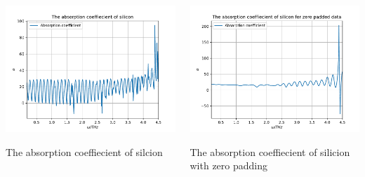 \documentclass[aspectratio=1610, 9pt]{beamer}
\begin{document}
\begin{frame}
  \begin{center}
    \begin{columns}
      \begin{column}
        \includegraphics[width=\textwidth]{silicon/THz_absorption.pdf}
        \caption{The absorption coeffiecient of silcion}
      \end{column}
      \begin{column}
        \includegraphics[width=\textwidth]{silicon/THz_absorption_zero.pdf}
        \caption{The absorption coeffiecient of silicion with zero padding}
      \end{column}
    \end{columns}
  \end{center}
\end{frame}
\end{document}
